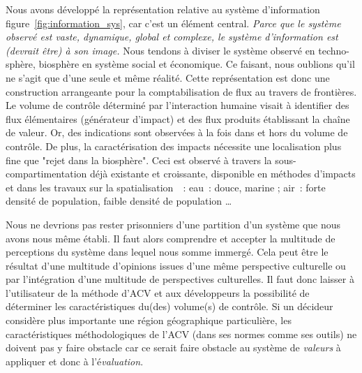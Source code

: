 Nous avons développé la représentation relative au système d'information figure~\ref{fig:information_sys}, car c'est un élément central.
\emph{Parce que le système observé est vaste, dynamique, global et complexe, le système d'information est (devrait être) à son image.}
Nous tendons à diviser le système observé en techno-sphère, biosphère en système social et économique.
Ce faisant, nous oublions qu'il ne s'agit que d'une seule et même réalité.
Cette représentation est donc une construction arrangeante pour la comptabilisation de flux au travers de frontières.
Le volume de contrôle déterminé par l'interaction humaine visait à identifier des flux élémentaires (générateur d'impact) et des flux produits établissant la chaîne de valeur.
Or, des indications sont observées à la fois dans et hors du volume de contrôle.
De plus, la caractérisation des impacts nécessite une localisation plus fine que "rejet dans la biosphère".
Ceci est observé à travers la sous-compartimentation déjà existante et croissante, disponible en méthodes d'impacts et dans les travaux sur la spatialisation~\cite{yan_ontology_2015}~:
eau~: douce, marine ; air~: forte densité de population, faible densité de population \ldots

Nous ne devrions pas rester prisonniers d'une partition d'un système que nous avons nous même établi.
Il faut alors comprendre et accepter la multitude de perceptions du système dans lequel nous somme immergé.
Cela peut être le résultat d'une multitude d'opinions issues d'une même perspective culturelle ou par l'intégration d'une multitude de perspectives culturelles.
Il faut donc laisser à l'utilisateur de la méthode d'\gls{ACV} et aux développeurs la possibilité de déterminer les caractéristiques du(des) volume(s) de contrôle.
Si un décideur considère plus importante une région géographique particulière, les caractéristiques méthodologiques de l'\gls{ACV} (dans ses normes comme ses outils) ne doivent pas y faire obstacle car ce serait faire obstacle au système de \emph{valeurs} à appliquer et donc à l'é\emph{valuation}.


